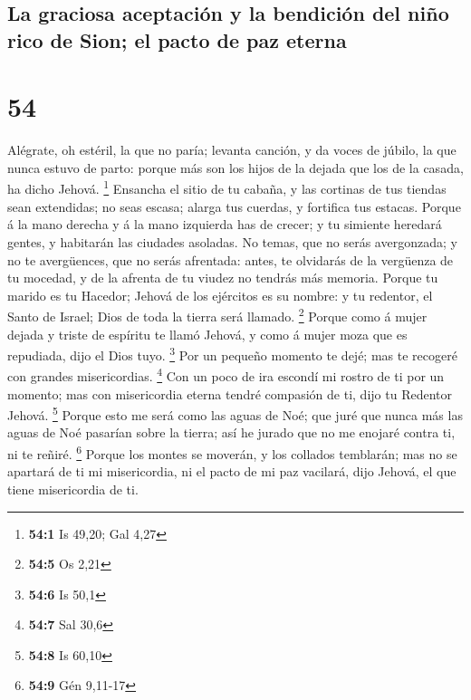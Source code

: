 \hypertarget{la-graciosa-aceptaciuxf3n-y-la-bendiciuxf3n-del-niuxf1o-rico-de-sion-el-pacto-de-paz-eterna}{%
\subsection{La graciosa aceptación y la bendición del niño rico de Sion;
el pacto de paz
eterna}\label{la-graciosa-aceptaciuxf3n-y-la-bendiciuxf3n-del-niuxf1o-rico-de-sion-el-pacto-de-paz-eterna}}

\hypertarget{section-53}{%
\section{54}\label{section-53}}

 Alégrate, oh estéril, la que no paría; levanta canción, y
da voces de júbilo, la que nunca estuvo de parto: porque más son los
hijos de la dejada que los de la casada, ha dicho Jehová. \footnote{\textbf{54:1}
  Is 49,20; Gal 4,27}  Ensancha el sitio de tu cabaña, y
las cortinas de tus tiendas sean extendidas; no seas escasa; alarga tus
cuerdas, y fortifica tus estacas.  Porque á la mano
derecha y á la mano izquierda has de crecer; y tu simiente heredará
gentes, y habitarán las ciudades asoladas.  No temas, que
no serás avergonzada; y no te avergüences, que no serás afrentada:
antes, te olvidarás de la vergüenza de tu mocedad, y de la afrenta de tu
viudez no tendrás más memoria.  Porque tu marido es tu
Hacedor; Jehová de los ejércitos es su nombre: y tu redentor, el Santo
de Israel; Dios de toda la tierra será llamado. \footnote{\textbf{54:5}
  Os 2,21}  Porque como á mujer dejada y triste de
espíritu te llamó Jehová, y como á mujer moza que es repudiada, dijo el
Dios tuyo. \footnote{\textbf{54:6} Is 50,1}  Por un
pequeño momento te dejé; mas te recogeré con grandes misericordias.
\footnote{\textbf{54:7} Sal 30,6}  Con un poco de ira
escondí mi rostro de ti por un momento; mas con misericordia eterna
tendré compasión de ti, dijo tu Redentor Jehová. \footnote{\textbf{54:8}
  Is 60,10}  Porque esto me será como las aguas de Noé;
que juré que nunca más las aguas de Noé pasarían sobre la tierra; así he
jurado que no me enojaré contra ti, ni te reñiré. \footnote{\textbf{54:9}
  Gén 9,11-17}  Porque los montes se moverán, y los
collados temblarán; mas no se apartará de ti mi misericordia, ni el
pacto de mi paz vacilará, dijo Jehová, el que tiene misericordia de ti.

